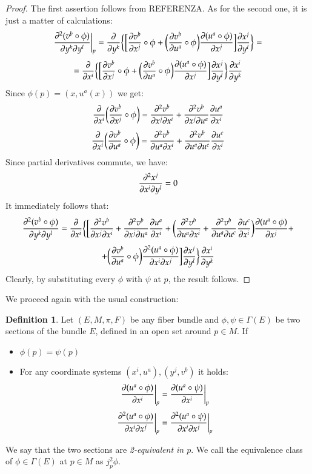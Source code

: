 \documentclass[12pt,a4paper]{report}
\theoremstyle{definition}
\newtheorem{Def}{Definition}[chapter]
\theoremstyle{Theorem}
\theoremstyle{break}
\theoremstyle{definition}
\begin{document}
	\begin{proof}
		The first assertion follows from REFERENZA. As for the second one, it is just a matter of calculations:
		$${\partial^2(v^b\circ\phi) \over \partial{y^k}\partial{y^l}}\bigg|_p={\partial\over \partial y^k}\bigg\{\bigg[{\partial v^b\over \partial{x^j}}\circ \phi+\bigg({\partial v^b\over \partial{u^a}}\circ \phi\bigg) {\partial(u^a\circ \phi)\over \partial{x^j}}\bigg]{\partial x^j\over  \partial y^l}\bigg\}=$$
		$$={\partial\over \partial x^i}\bigg\{\bigg[{\partial v^b\over \partial{x^j}}\circ \phi+\bigg({\partial v^b\over \partial{u^a}}\circ \phi\bigg) {\partial(u^a\circ \phi)\over \partial{x^j}}\bigg]{\partial x^j\over  \partial y^l}\bigg\}{\partial x^i\over \partial y^k}$$
		Since $\phi(p)=(x,u^a(x))$ we get:
		$${\partial\over \partial x^i}\bigg({\partial v^b\over \partial{x^j}}\circ \phi\bigg)=
		{\partial^2 v^b\over \partial{x^j}\partial x^i}+{\partial^2 v^b\over \partial{x^j}\partial u^a}{\partial u^a\over \partial x^i}$$
		$${\partial\over \partial x^i}\bigg({\partial v^b\over \partial{u^a}}\circ \phi\bigg)=
		{\partial^2 v^b\over \partial{u^a}\partial x^i}+{\partial^2 v^b\over \partial{u^a}\partial u^c}{\partial u^c\over \partial x^i}$$
		Since partial derivatives commute, we have:
		$${\partial^2 x^j\over \partial x^i\partial y^l}=0$$
		It immediately follows that:
		$${\partial^2(v^b\circ\phi) \over \partial{y^k}\partial{y^l}}={\partial\over \partial x^i}\bigg\{\bigg[{\partial^2 v^b\over \partial{x^j}\partial x^i}+{\partial^2 v^b\over \partial{x^j}\partial u^a}{\partial u^a\over \partial x^i}+\bigg({\partial^2 v^b\over \partial{u^a}\partial x^i}+{\partial^2 v^b\over \partial{u^a}\partial u^c}{\partial u^c\over \partial x^i}\bigg){\partial(u^a\circ \phi)\over \partial{x^j}}+$$$$+\bigg({\partial v^b\over \partial{u^a}}\circ \phi\bigg) {\partial^2(u^a\circ \phi)\over \partial{x^i}\partial{x^j}}\bigg]{\partial x^j\over  \partial y^l}\bigg\}{\partial x^i\over \partial y^k}$$
		Clearly, by substituting every $\phi$ with $\psi$ at $p$, the result follows.
	\end{proof}
	We proceed again with the usual construction:
	\begin{Def}
		Let $(E,M,\pi,F)$ be any fiber bundle and $\phi,\psi\in\Gamma(E)$ be two sections of the bundle $E$, defined in an open set around $p\in M$. If
		\begin{itemize}
			\item $\phi(p)=\psi(p)$ 
			\item For any coordinate systems $(x^i,u^a),(y^j,v^b)$ it holds:
			$${\partial(u^a\circ\phi) \over \partial{x^i}}\bigg|_p={\partial(u^a\circ\psi) \over \partial{x^i}}\bigg|_p$$
			$${\partial^2(u^a\circ\phi) \over \partial{x^i}\partial{x^j}}\bigg|_p={\partial^2(u^a\circ\psi) \over \partial{x^i}\partial{x^j}}\bigg|_p$$
		\end{itemize} 
		We say that the two sections are \textit{2-equivalent in $p$}. We call the equivalence class of $\phi\in\Gamma(E)$ at $p\in M$ as $j_p^2\phi$.
	\end{Def}
\end{document}

